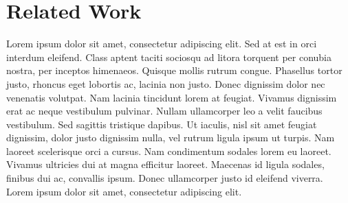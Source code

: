 \section{Related Work}\label{related-work}

Lorem ipsum dolor sit amet, consectetur adipiscing elit. Sed at est in
orci interdum eleifend. Class aptent taciti sociosqu ad litora torquent
per conubia nostra, per inceptos himenaeos. Quisque mollis rutrum
congue. Phasellus tortor justo, rhoncus eget lobortis ac, lacinia non
justo. Donec dignissim dolor nec venenatis volutpat. Nam lacinia
tincidunt lorem at feugiat. Vivamus dignissim erat ac neque vestibulum
pulvinar. Nullam ullamcorper leo a velit faucibus vestibulum. Sed
sagittis tristique dapibus. Ut iaculis, nisl sit amet feugiat dignissim,
dolor justo dignissim nulla, vel rutrum ligula ipsum ut turpis. Nam
laoreet scelerisque orci a cursus. Nam condimentum sodales lorem eu
laoreet. Vivamus ultricies dui at magna efficitur laoreet. Maecenas id
ligula sodales, finibus dui ac, convallis ipsum. Donec ullamcorper justo
id eleifend viverra. Lorem ipsum dolor sit amet, consectetur adipiscing
elit.
